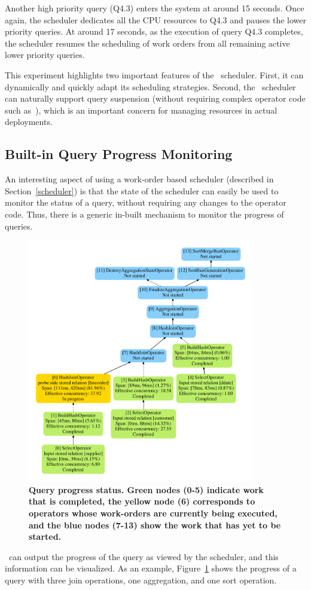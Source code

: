 Another high priority query (Q4.3) enters the system at around 15 seconds.
Once again, the scheduler dedicates all the CPU resources to Q4.3 and pauses the lower priority queries.
At around 17 seconds, as the execution of query Q4.3 completes, the scheduler resumes the scheduling of work orders from all remaining active lower priority queries.

This experiment highlights two important features of the \Quickstep\ scheduler.
First, it can dynamically and quickly adapt its scheduling strategies. %
Second, the \Quickstep\ scheduler can naturally support query suspension (without requiring complex operator code such as~\cite{DavisonG94}), which is an important concern for managing resources in actual deployments.

\subsection{Built-in Query Progress Monitoring}\label{sec:progress-monitoring}
An interesting aspect of using a work-order based scheduler (described in Section~\ref{scheduler}) is that the state of the scheduler can easily be used to monitor the status of a query, without requiring any changes to the operator code. Thus, there is a generic in-built mechanism to monitor the progress of queries.

\begin{figure}[thb]
\centering
   \includegraphics[width=0.6\columnwidth,height=4.2in]{system/figures/q31-progress.pdf}
   \caption{\small \textbf{Query progress status. Green nodes (0-5) indicate work that is completed, the yellow node (6) corresponds to operators whose work-orders are currently being executed, and the blue nodes (7-13) show the work that has yet to be started.}}
   \label{fig-query-progress}
\end{figure}


\Quickstep\ can output the progress of the query as viewed by the scheduler, and this information can be visualized. As an example, Figure~\ref{fig-query-progress} shows the progress of a query with three join operations, one aggregation, and one sort operation.

